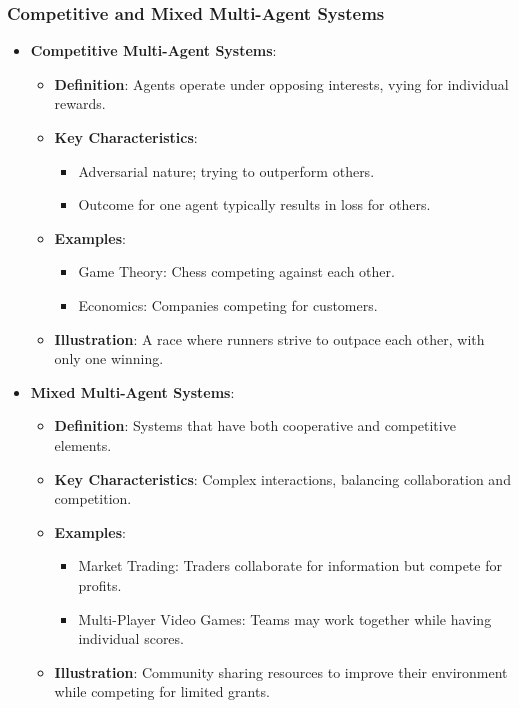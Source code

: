 \documentclass[aspectratio=169]{beamer}
\begin{document}
\begin{frame}[fragile]
    \frametitle{Competitive and Mixed Multi-Agent Systems}
    \begin{itemize}
        \item \textbf{Competitive Multi-Agent Systems}:
            \begin{itemize}
                \item \textbf{Definition}: Agents operate under opposing interests, vying for individual rewards.
                \item \textbf{Key Characteristics}:
                    \begin{itemize}
                        \item Adversarial nature; trying to outperform others.
                        \item Outcome for one agent typically results in loss for others.
                    \end{itemize}
                \item \textbf{Examples}:
                    \begin{itemize}
                        \item Game Theory: Chess competing against each other.
                        \item Economics: Companies competing for customers.
                    \end{itemize}
                \item \textbf{Illustration}: A race where runners strive to outpace each other, with only one winning.
            \end{itemize}
    \end{itemize}

    \begin{itemize}
        \item \textbf{Mixed Multi-Agent Systems}:
            \begin{itemize}
                \item \textbf{Definition}: Systems that have both cooperative and competitive elements.
                \item \textbf{Key Characteristics}: Complex interactions, balancing collaboration and competition.
                \item \textbf{Examples}:
                    \begin{itemize}
                        \item Market Trading: Traders collaborate for information but compete for profits.
                        \item Multi-Player Video Games: Teams may work together while having individual scores.
                    \end{itemize}
                \item \textbf{Illustration}: Community sharing resources to improve their environment while competing for limited grants.
            \end{itemize}
    \end{itemize}
\end{frame}
\end{document}
